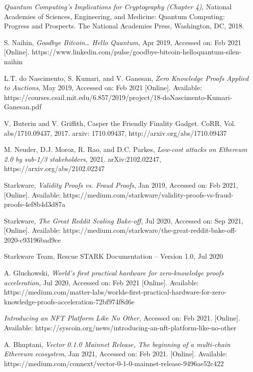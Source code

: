 \documentclass[peerreview]{ieeesyscoin}
\begin{document}
\begin{thebibliography}{00}
 \textit{Quantum Computing’s Implications for Cryptography (Chapter 4)}, National Academies of Sciences, Engineering, and Medicine: Quantum Computing: Progress and Prospects. The National Academies Press, Washington, DC, 2018.

 S. Naihin, \textit{Goodbye Bitcoin… Hello Quantum}, Apr 2019, Accessed on: Feb 2021 [Online].   https://www.linkedin.com/pulse/goodbye-bitcoin-helloquantum-silen-naihin

 L.T. do Nascimento, S. Kumari, and V. Ganesan, \textit{Zero Knowledge Proofs Applied to Auctions}, May 2019, Accessed on: Feb 2021 [Online].   Available: https://courses.csail.mit.edu/6.857/2019/project/18-doNascimento-Kumari-Ganesan.pdf

 V. Buterin and V. Griffith, Casper the Friendly Finality Gadget. CoRR, Vol. abs/1710.09437, 2017. arxiv: 1710.09437, http://arxiv.org/abs/1710.09437

 M. Neuder, D.J. Moroz, R. Rao, and D.C. Parkes, \textit{Low-cost attacks on Ethereum 2.0 by sub-1/3 stakeholders}, 2021. arXiv:2102.02247,  https://arxiv.org/abs/2102.02247

 Starkware, \textit{Validity Proofs vs. Fraud Proofs}, Jan 2019, Accessed on: Feb 2021, [Online]. Available: https://medium.com/starkware/validity-proofs-vs-fraud-proofs-4ef8b4d3d87a

 Starkware, \textit{The Great Reddit Scaling Bake-off}, Jul 2020, Accessed on: Sep 2021, [Online]. Available: https://medium.com/starkware/the-great-reddit-bake-off-2020-c93196bad9ce

  Starkware Team, Rescue STARK Documentation – Version 1.0, Jul 2020

 A. Gluchowski, \textit{World’s first practical hardware for zero-knowledge proofs acceleration}, Jul 2020, Accessed on: Feb 2021 [Online]. Available:  https://medium.com/matter-labs/worlds-first-practical-hardware-for-zero-knowledge-proofs-acceleration-72bf974f8d6e

  \textit{Introducing an NFT Platform Like No Other}, Accessed on: Feb 2021. [Online]. Available: https://syscoin.org/news/introducing-an-nft-platform-like-no-other

 A. Bhuptani, \textit{Vector 0.1.0 Mainnet Release, The beginning of a multi-chain Ethereum ecosystem}, Jan 2021, Accessed on: Feb 2021.  [Online]. Available:  https://medium.com/connext/vector-0-1-0-mainnet-release-9496ae52c422


\end{thebibliography}
\end{document}
